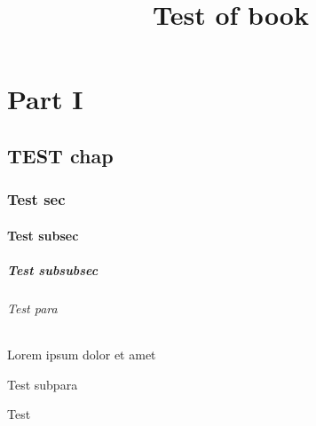 \documentclass[10pt]{book}
\title{Test of book}
\begin{document}
    \tableofcontents
    
    
    \part{Part I}
    
    \chapter{TEST chap}
    \section{Test sec}
    \subsection{Test subsec}
    \subsubsection{Test subsubsec}
    \paragraph{Test para} Lorem ipsum dolor et amet
    \subparagraph{Test subpara}
    Test
\end{document}

